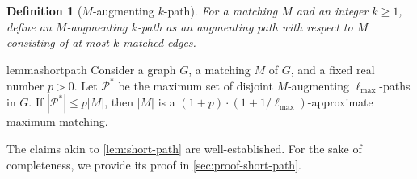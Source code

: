 \documentclass{article}
\newcommand{\lmax}{\ell_{\max}}
\newcommand{\calP}{\mathcal{P}}
\newtheorem{definition}[theorem]{Definition}
\begin{document}
\begin{definition} [$M$-augmenting $k$-path] For a matching $M$ and an integer $k \geq 1$, define an $M$-augmenting $k$-path as an augmenting path with respect to $M$ consisting of at most $k$ matched edges.
\end{definition}



\begin{restatable}{lemma}{shortpath} \label{lem:short-path} Consider a graph $G$, a matching $M$ of $G$, and a fixed real number $p > 0$. Let $\calP^*$ be the maximum set of disjoint $M$-augmenting $\lmax$-paths in $G$. If $|\calP^*| \leq p|M|$, then $|M|$ is a $(1 + p) \cdot (1 + 1 / \lmax)$-approximate maximum matching.
\end{restatable}
The claims akin to \cref{lem:short-path} are well-established. For the sake of completeness, we provide its proof in \cref{sec:proof-short-path}.
\end{document}
